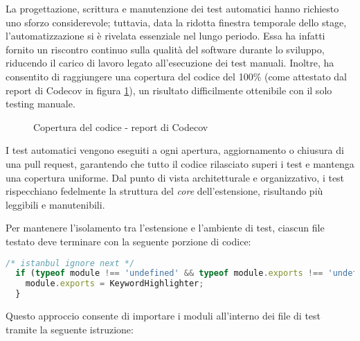 \vspace{10pt}
\noindent La progettazione, scrittura e manutenzione dei test automatici hanno richiesto uno sforzo considerevole; tuttavia, data la ridotta finestra temporale dello stage, l’automatizzazione si è rivelata essenziale nel lungo periodo. Essa ha infatti fornito un riscontro continuo sulla qualità del software durante lo sviluppo, riducendo il carico di lavoro legato all’esecuzione dei test manuali. Inoltre, ha consentito di raggiungere una copertura del codice del 100\% (come attestato dal report di Codecov in figura \ref{fig:report_codecov}), un risultato difficilmente ottenibile con il solo testing manuale.

\begin{figure}[H]
  \centering 
  \caption{Copertura del codice - report di Codecov}
  \label{fig:report_codecov}
\end{figure}

\noindent I test automatici vengono eseguiti a ogni apertura, aggiornamento o chiusura di una \gls{pull request}, garantendo che tutto il codice rilasciato superi i test e mantenga una copertura uniforme. Dal punto di vista architetturale e organizzativo, i test rispecchiano fedelmente la struttura del \textit{core} dell’estensione, risultando più leggibili e manutenibili. 

\vspace{10pt}
\begin{samepage}
\end{samepage}

\vspace{10pt}
\noindent Per mantenere l’isolamento tra l'estensione e l’ambiente di test, ciascun file testato deve terminare con la seguente porzione di codice:

\vspace{10pt}
\begin{samepage}
\begin{lstlisting}[language=JavaScript]
  /* istanbul ignore next */
  if (typeof module !== 'undefined' && typeof module.exports !== 'undefined') {
    module.exports = KeywordHighlighter;
  }
\end{lstlisting}
\end{samepage}

\vspace{10pt}
\noindent Questo approccio consente di importare i moduli all’interno dei file di test tramite la seguente istruzione:

